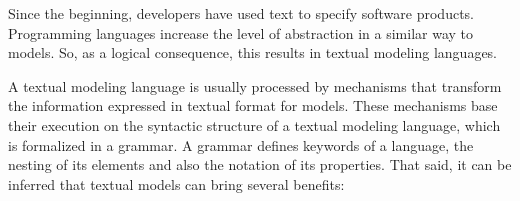Since the beginning, developers have used text to specify software products.
Programming languages increase the level of abstraction in a similar way to models.
So, as a logical consequence, this results in textual modeling languages.

A textual modeling language is usually processed by mechanisms that transform the information expressed in textual format for models.
These mechanisms base their execution on the syntactic structure of a textual modeling language, which is formalized in a grammar.
A grammar defines keywords of a language, the nesting of its elements and also the notation of its properties.
That said, it can be inferred that textual models can bring several benefits:

